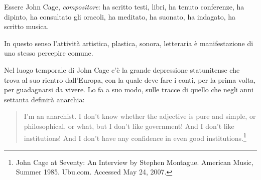 
Essere John Cage, \emph{compositore}: ha scritto testi, libri, ha tenuto conferenze, ha dipinto,
ha consultato gli oracoli, ha meditato, ha suonato, ha indagato, ha scritto musica.


In questo senso l'attivit\`a artistica, plastica, sonora, letteraria \`e manifestazione di uno
stesso percepire comune.

Nel luogo temporale di John Cage c'\`e la grande depressione statunitense che trova al suo rientro dall'Europa,
con la quale deve fare i conti, per la prima volta, per guadagnarsi da vivere. Lo fa a suo modo,
sulle tracce di quello che negli anni settanta definir\`a anarchia:

\begin{quote}
	I'm an anarchist. I don't know whether the adjective is pure and simple, or philosophical, or what, but I don't
	like government! And I don't like institutions! And I don't have any confidence in even good institutions.\footnote{John
		Cage at Seventy: An Interview by Stephen Montague. American Music, Summer 1985. Ubu.com. Accessed May 24, 2007.}
\end{quote}

